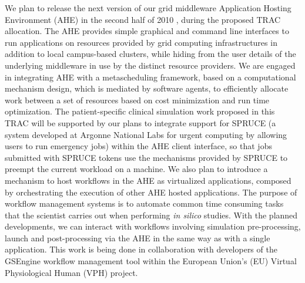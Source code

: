We plan to release the next version of our grid middleware Application Hosting Environment (AHE) in the second half of 2010 \cite{zasada2009,coveney2007}, during the proposed TRAC allocation.  The AHE provides simple graphical and command line interfaces to run applications on resources provided by grid computing infrastructures in addition to local campus-based clusters, while hiding from the user details of the underlying middleware in use by the distinct resource providers.  We are engaged in integrating AHE with a metascheduling framework, based on a computational mechanism design, which is mediated by software agents, to efficiently allocate work between a set of resources based on cost minimization and run time optimization.  The patient-specific clinical simulation work proposed in this TRAC will be supported by our plans to integrate support for SPRUCE (a system developed at Argonne National Labs for urgent computing by allowing users to run emergency jobs) within the AHE client interface, so that jobs submitted with SPRUCE tokens use the mechanisms provided by SPRUCE to preempt the current workload on a machine. We also plan to introduce a mechanism to host workflows in the AHE as virtualized applications, composed by orchestrating the execution of other AHE hosted applications. The purpose of workflow management systems is to automate common time consuming tasks that the scientist carries out when performing \emph{in silico} studies. With the planned developments, we can interact with workflows involving simulation pre-processing, launch and post-processing via the AHE in the same way as with a single application. This work is being done in collaboration with developers of the GSEngine workflow management tool within the European Union's (EU) Virtual Physiological Human (VPH) project.

